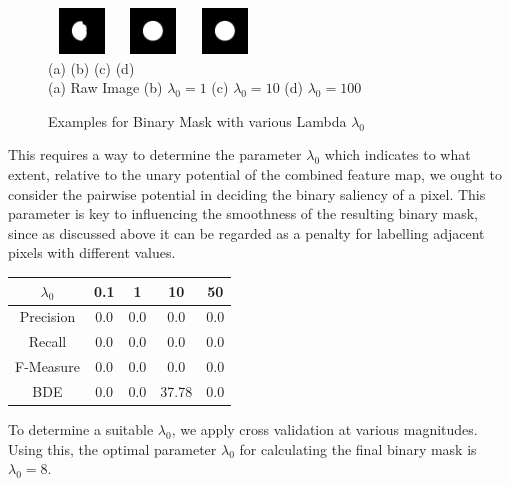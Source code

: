 \documentclass[10pt,twocolumn,letterpaper]{article}
\newcommand{\hs}{\hspace{0.58in}}
\begin{document}
\begin{figure}[t]
\begin{center}
    \includegraphics[width=0.7in,height=0.48in]{./Figures/Lambda/5_154_154732_2.jpg}
    \includegraphics[width=0.7in,height=0.48in]{./Figures/Lambda/5_154_154732_3.jpg} 
    \includegraphics[width=0.7in,height=0.48in]{./Figures/Lambda/5_154_154732_4.jpg} \\
    \footnotesize \hspace{0.1cm} (a) \hs (b) \hs  (c) \hs (d) \\
    \footnotesize  (a) Raw Image (b) $\lambda_0 = 1$  (c) $\lambda_0 = 10$ (d) $\lambda_0 =100$ \\
     \caption{Examples for Binary Mask with various Lambda $\lambda_0$}
\end{center}
\end{figure}


This requires a way to determine the parameter $\lambda_0$ which indicates to what extent, relative to the unary potential of the combined feature map, we ought to consider the pairwise potential in deciding the binary saliency of a pixel.  This parameter is key to influencing the smoothness of the resulting binary mask, since as discussed above it can be regarded as a penalty for labelling adjacent pixels with different values.

\begin{center}
\begin{tabular}{|c|c|c|c|c|}
    \hline
    $\lambda_0$ & 0.1 & 1   & 10 & 50 \\ \hline
    Precision   & 0.0 & 0.0 & 0.0 & 0.0 \\
    Recall      & 0.0 & 0.0 & 0.0 & 0.0 \\
    F-Measure   & 0.0 & 0.0 & 0.0 & 0.0 \\
    BDE & 0.0   & 0.0 & 37.78 &0.0 \\ \hline
\end{tabular}

\end{center}

To determine a suitable $\lambda_0$, we apply cross validation at various magnitudes.  Using this, the optimal parameter $\lambda_0$ for calculating the final binary mask is $\lambda_0 = 8$.
\end{document}
